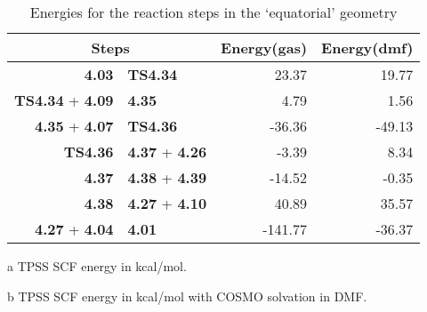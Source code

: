 \begin{table}[!htb]
\centering
 \begin{threeparttable}
  \caption{Energies for the reaction steps in the `equatorial' geometry}
    \begin{tabular}{r@{ $\rightarrow$ }lrr}
    \toprule
    \multicolumn{2}{c}{Steps} & Energy(gas)\tnote{a} & Energy(dmf)\tnote{b} \\
    \midrule
    \textbf{4.03} & \textbf{TS4.34} & 23.37 & 19.77 \\
    \textbf{TS4.34} + \textbf{4.09} & \textbf{4.35} & 4.79 & 1.56 \\
    \textbf{4.35} + \textbf{4.07} & \textbf{TS4.36} & -36.36 & -49.13 \\
    \textbf{TS4.36} & \textbf{4.37} + \textbf{4.26} & -3.39 & 8.34 \\
    \textbf{4.37} & \textbf{4.38} + \textbf{4.39} & -14.52 & -0.35 \\
    \textbf{4.38} & \textbf{4.27} + \textbf{4.10} & 40.89 & 35.57 \\
    \textbf{4.27} + \textbf{4.04} & \textbf{4.01} & -141.77 & -36.37 \\
    \bottomrule
    \end{tabular}%
    \begin{tablenotes}
    \item [a] TPSS SCF energy in kcal/mol.
    \item [b] TPSS SCF energy in kcal/mol with COSMO solvation in DMF.
    \end{tablenotes}
  \label{tab.siderxn}%
 \end{threeparttable}
\end{table}%


